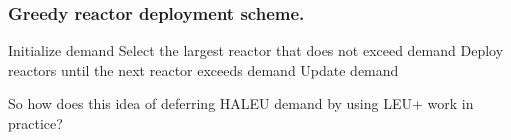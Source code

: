 \documentclass[9pt]{beamer}
\begin{document}
  \begin{frame}
    \frametitle{Greedy reactor deployment scheme.}
      \begin{algorithmic}[1]
          \State Initialize demand
              \State Select the largest reactor that does not exceed demand
              \State Deploy reactors until the next reactor exceeds demand
              \State Update demand
          \EndWhile
      \end{algorithmic}\pause
    So how does this idea of deferring HALEU demand by using LEU+ work in practice?
  \end{frame}


\end{document}
